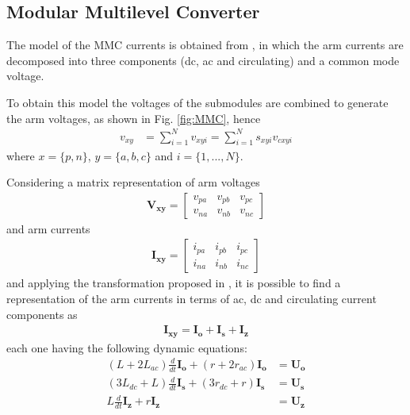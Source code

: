 \documentclass[conference]{IEEEtran}
\begin{document}
\subsection{Modular Multilevel Converter}
The model of the MMC currents is obtained from \cite{7047221}, in which the arm currents are decomposed into three components (dc, ac and circulating) and a common mode voltage.

To obtain this model the voltages of the submodules are combined to generate the arm voltages, as shown in Fig. \ref{fig:MMC}, hence
\begin{align}
v_{xy}&=\sum_{i=1}^N v_{xyi}=\sum_{i=1}^N s_{xyi}v_{cxyi}
\end{align}
where $x=\{p,n\}$, $y=\{a,b,c\}$ and $i=\{1,...,N\}$.

Considering a matrix representation of arm voltages 
\begin{align}
\mathbf{V_{xy}}=
\left[\begin{array}{ccc}v_{pa}&v_{pb}&v_{pc}\\v_{na}&v_{nb}&v_{nc}\end{array}\right]
\end{align}
and arm currents
\begin{align}
\mathbf{I_{xy}}=
\left[\begin{array}{ccc}i_{pa}&i_{pb}&i_{pc}\\i_{na}&i_{nb}&i_{nc}\end{array}\right]
\end{align}
and applying the transformation proposed in \cite{7047221}, it  is possible to find a representation of the arm currents in terms of ac, dc and circulating current components as
\begin{align}
\mathbf{I_{xy}}=\mathbf{I_{o}}+\mathbf{I_{s}}+\mathbf{I_{z}}
\end{align}
each one having the following dynamic equations:
\begin{align}
(L+2L_{ac})\frac{d}{dt}\mathbf{I_{o}}+(r+2r_{ac})\mathbf{I_{o}}&=\mathbf{U_{o}}\\
(3L_{dc}+L)\frac{d}{dt}\mathbf{I_{s}}+(3r_{dc}+r)\mathbf{I_{s}}&=\mathbf{U_{s}}\\
L\frac{d}{dt}\mathbf{I_{z}}+r\mathbf{I_{z}}&=\mathbf{U_{z}}
\end{align}
\end{document}
